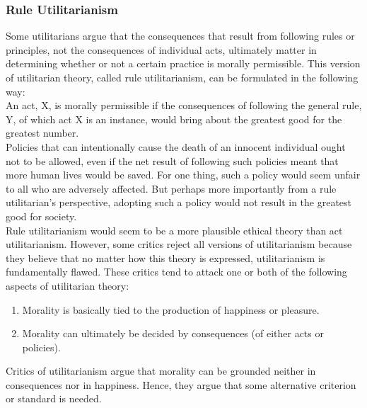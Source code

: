 \documentclass[12pt]{article}
\theoremstyle{definition}
\begin{document}
\subsubsection{Rule Utilitarianism}
Some utilitarians argue that the consequences that result from following rules or
principles, not the consequences of individual acts, ultimately matter in determining whether or not a certain practice is morally permissible. This version of utilitarian theory,
called rule utilitarianism, can be formulated in the following way:\\
An act, X, is morally permissible if the consequences of following the general rule, Y, of which
act X is an instance, would bring about the greatest good for the greatest number.\\
Policies that can intentionally cause the death of an innocent individual
ought not to be allowed, even if the net result of following such policies meant that more
human lives would be saved. For one thing, such a policy would seem unfair to all who are
adversely affected. But perhaps more importantly from a rule utilitarian’s perspective,
adopting such a policy would not result in the greatest good for society.\\
Rule utilitarianism would seem to be a more plausible ethical theory than act
utilitarianism. However, some critics reject all versions of utilitarianism because they
believe that no matter how this theory is expressed, utilitarianism is fundamentally
flawed. These critics tend to attack one or both of the following aspects of utilitarian
theory:
\begin{enumerate}
\item Morality is basically tied to the production of happiness or pleasure.
\item Morality can ultimately be decided by consequences (of either acts or policies).
\end{enumerate}
Critics of utilitarianism argue that morality can be grounded neither in consequences
nor in happiness. Hence, they argue that some alternative criterion or standard is needed.
\end{document}
